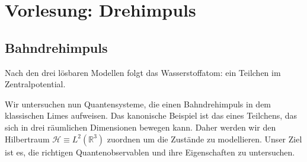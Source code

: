 \section{Vorlesung: Drehimpuls}

\subsection{Bahndrehimpuls}
Nach den drei lösbaren Modellen folgt das Wasserstoffatom: ein Teilchen im Zentralpotential.

Wir untersuchen nun Quantensysteme, die einen Bahndrehimpuls in dem klassischen Limes aufweisen. Das kanonische Beispiel ist das eines Teilchens, das sich in drei räumlichen Dimensionen bewegen kann. Daher werden wir den Hilbertraum $\mathcal{H} \equiv L^2(\mathbb{R}^3)$ zuordnen um die Zustände zu modellieren. Unser Ziel ist es, die richtigen Quantenobservablen und ihre Eigenschaften zu untersuchen.


